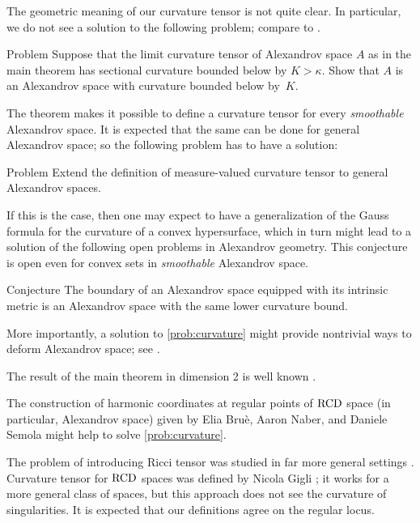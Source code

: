 The geometric meaning of our curvature tensor is not quite clear. 
In particular, we do not see a solution to the following problem;
compare to \cite[Conjecture~1.1]{G}.

\begin{thm}{Problem}
Suppose that the limit curvature tensor of Alexandrov space $A$ as in the main theorem has sectional curvature bounded below by $K>\kappa$.
Show that $A$ is an Alexandrov space with curvature bounded below by~$K$.
\end{thm}

The theorem makes it possible to define a curvature tensor for every \emph{smoothable} Alexandrov space.
It is expected that the same can be done for general Alexandrov space; so the following problem has to have a solution:

\begin{thm}{Problem}\label{prob:curvature}
Extend the definition of measure-valued curvature tensor to general Alexandrov spaces.
\end{thm}

If this is the case, then one may expect to have a generalization of the Gauss formula for the curvature of a convex hypersurface, which in turn might lead to a solution of the following open problems in Alexandrov geometry.
This conjecture is open even for convex sets in \emph{smoothable} Alexandrov space.

\begin{thm}{Conjecture}
The boundary of an Alexandrov space equipped with its intrinsic metric is an Alexandrov space with the same lower curvature bound.
\end{thm}

More importantly, a solution to \ref{prob:curvature} might provide nontrivial ways to deform Alexandrov space; see \cite[Section 9]{petrunin-conc}. 

The result of the main theorem in dimension 2 is well known \cite[VII \S13]{AZ}.

The construction of harmonic coordinates at regular points of $\operatorname{RCD}$ space (in particular, Alexandrov space) given by Elia Bruè, Aaron Naber, and Daniele Semola \cite{BNS} might help to solve \ref{prob:curvature}.

The problem of introducing Ricci tensor
was studied in far more general settings \cite{G1,St,H,L}.
Curvature tensor for $\operatorname{RCD}$ spaces was defined by Nicola Gigli \cite{G};
it works for a more general class of spaces, but this approach does not see the curvature of singularities.
It is expected that our definitions agree on the regular locus.

